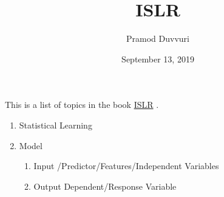 \documentclass[11pt]{article}
\title{ISLR}
\author{Pramod Duvvuri}
\date{September 13, 2019}
\begin{document}
	\maketitle
	This is a list of topics in the book \href{http://faculty.marshall.usc.edu/gareth-james/ISL/}{ISLR} .
	\begin{enumerate} 
		\item Statistical Learning
		\item Model
		\begin{enumerate}
			\item Input /Predictor/Features/Independent Variables
			\item Output Dependent/Response Variable
		\end{enumerate}
	\end{enumerate}
\end{document}
